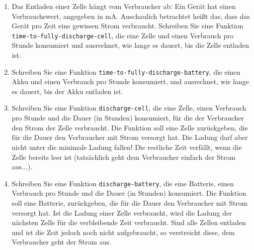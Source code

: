 \begin{aufgabe}
\begin{enumerate}
  \item Das Entladen einer Zelle hängt vom Verbraucher ab: Ein Gerät
    hat einen Verbrauchswert, angegeben in mA.  Anschaulich betrachtet
    heißt das, dass das Gerät pro Zeit eine gewissen Strom verbraucht.
    Schreiben Sie eine Funktion \texttt{time-to-fully-discharge-cell},
    die eine Zelle und einen Verbrauch pro Stunde konsumiert und
    ausrechnet, wie lange es dauert, bis die Zelle entladen ist.

  \item Schreiben Sie eine Funktion
    \texttt{time-to-fully-discharge-battery}, die einen Akku und einen
    Verbrauch pro Stunde konsumiert, und ausrechnet, wie lange es
    dauert, bis der Akku entladen ist.

  \item Schreiben Sie eine Funktion \texttt{discharge-cell}, die eine
    Zelle, einen Verbrauch pro Stunde und die Dauer (in Stunden)
    konsumiert, für die der Verbraucher den Strom der Zelle
    verbraucht.  Die Funktion soll eine Zelle zurückgeben, die für die
    Dauer den Verbraucher mit Strom versorgt hat.  Die Ladung darf
    aber nicht unter die minimale Ladung fallen! Die restliche Zeit
    verfällt, wenn die Zelle bereits leer ist (tatsächlich geht dem
    Verbraucher einfach der Strom aus...).

  \item Schreiben Sie eine Funktion \texttt{discharge-battery}, die
    eine Batterie, einen Verbrauch pro Stunde und die Dauer (in
    Stunden) konsumiert.  Die Funktion soll eine Batterie,
    zurückgeben, die für die Dauer den Verbraucher mit Strom versorgt
    hat.  Ist die Ladung einer Zelle verbraucht, wird die Ladung der
    nächsten Zelle für die verbleibende Zeit verbraucht.  Sind alle
    Zellen entladen und ist die Zeit jedoch noch nicht aufgebraucht,
    so verstreicht diese, dem Verbraucher geht der Strom aus.

  \end{enumerate}
  
\end{aufgabe}

